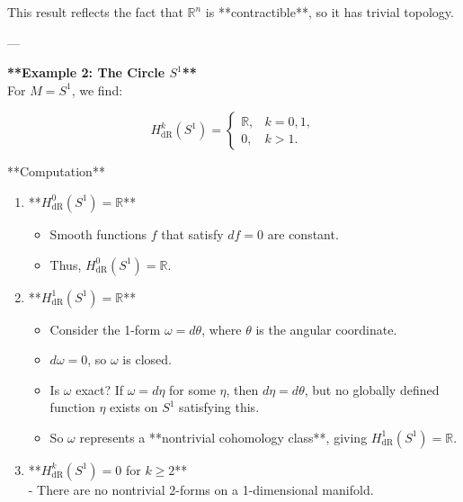 \documentclass[10pt,a4paper]{report}
\begin{document}
\begin{description}
\begin{enumerate}
\begin{itemize}
This result reflects the fact that \( \mathbb{R}^n \) is **contractible**, so it has trivial topology.

\end{itemize}
\end{enumerate}

---\\

\item \textbf{ **Example 2: The Circle \( S^1 \)** }\\
 
For \( M = S^1 \), we find:

\[
H^k_{\text{dR}}(S^1) =
\begin{cases}
\mathbb{R}, & k = 0, 1, \\
0, & k > 1.
\end{cases}
\]

**Computation**\\
\begin{enumerate}

\item  **\( H^0_{\text{dR}}(S^1) = \mathbb{R} \)**  

\begin{itemize}

   \item  Smooth functions \( f \) that satisfy \( df = 0 \) are constant.
   \item  Thus, \( H^0_{\text{dR}}(S^1) = \mathbb{R} \).

\end{itemize}
\item  **\( H^1_{\text{dR}}(S^1) = \mathbb{R} \)**  \\
\begin{itemize}

   \item  Consider the 1-form \( \omega = d\theta \), where \( \theta \) is the angular coordinate.  
   \item  \( d\omega = 0 \), so \( \omega \) is closed.  \\
   \item  Is \( \omega \) exact? If \( \omega = d\eta \) for some \( \eta \), then \( d\eta = d\theta \), but no globally defined function \( \eta \) exists on \( S^1 \) satisfying this. \\ 
   \item  So \( \omega \) represents a **nontrivial cohomology class**, giving \( H^1_{\text{dR}}(S^1) = \mathbb{R} \).

\end{itemize}
\item  **\( H^k_{\text{dR}}(S^1) = 0 \) for \( k \geq 2 \)**  \\
   - There are no nontrivial 2-forms on a 1-dimensional manifold.


\end{enumerate}
\end{description}
\end{document}
